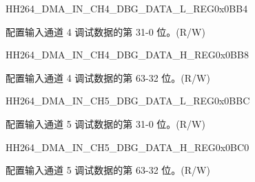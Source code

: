     
    \begin{register}{H}{H264\_DMA\_IN\_CH4\_DBG\_DATA\_L\_REG}{0x0BB4}\label{regdesc:H264DMAINCH4DBGDATALREG}
    \regnewline%
    \begin{regdesc}\begin{reglist}
    \label{fielddesc:H264INCH4DBGDATAL}\item [H264\_IN\_CH4\_DBG\_DATA\_L] 配置输入通道 4 调试数据的第 31-0 位。(R/W)
    \end{reglist}\end{regdesc}
    \end{register}
    
    
    \begin{register}{H}{H264\_DMA\_IN\_CH4\_DBG\_DATA\_H\_REG}{0x0BB8}\label{regdesc:H264DMAINCH4DBGDATAHREG}
    \regnewline%
    \begin{regdesc}\begin{reglist}
    \label{fielddesc:H264INCH4DBGDATAH}\item [H264\_IN\_CH4\_DBG\_DATA\_H] 配置输入通道 4 调试数据的第 63-32 位。(R/W)
    \end{reglist}\end{regdesc}
    \end{register}
    
    
    \begin{register}{H}{H264\_DMA\_IN\_CH5\_DBG\_DATA\_L\_REG}{0x0BBC}\label{regdesc:H264DMAINCH5DBGDATALREG}
    \regnewline%
    \begin{regdesc}\begin{reglist}
    \label{fielddesc:H264INCH5DBGDATAL}\item [H264\_IN\_CH5\_DBG\_DATA\_L] 配置输入通道 5 调试数据的第 31-0 位。(R/W)
    \end{reglist}\end{regdesc}
    \end{register}
    
    
    \begin{register}{H}{H264\_DMA\_IN\_CH5\_DBG\_DATA\_H\_REG}{0x0BC0}\label{regdesc:H264DMAINCH5DBGDATAHREG}
    \regnewline%
    \begin{regdesc}\begin{reglist}
    \label{fielddesc:H264INCH5DBGDATAH}\item [H264\_IN\_CH5\_DBG\_DATA\_H] 配置输入通道 5 调试数据的第 63-32 位。(R/W)
    \end{reglist}\end{regdesc}
    \end{register}
    
